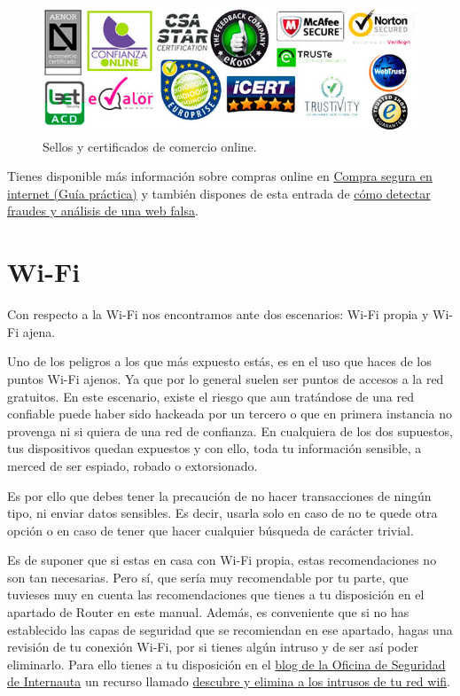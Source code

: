 \documentclass[
  spanish,
  a4paper,
  openany]{book}
\begin{document}
\begin{figure}

{\centering \includegraphics[width=0.75\linewidth]{images/sellos-de-confianza-online} 

}

\caption{Sellos y certificados de comercio online.}\label{fig:unnamed-chunk-11}
\end{figure}

Tienes disponible más información sobre compras online en \href{https://www.aepd.es/sites/default/files/2019-09/guia-compra-segura-digital-web.pdf}{Compra segura en internet (Guía práctica)} y también dispones de esta entrada de \href{https://www.osi.es/es/actualidad/blog/2018/08/08/detectando-fraudes-analisis-de-una-web-de-venta-falsa}{cómo detectar fraudes y análisis de una web falsa}.

\hypertarget{wi-fi}{%
\section{Wi-Fi}\label{wi-fi}}

Con respecto a la Wi-Fi nos encontramos ante dos escenarios: Wi-Fi propia y Wi-Fi ajena.

Uno de los peligros a los que más expuesto estás, es en el uso que haces de los puntos Wi-Fi ajenos. Ya que por lo general suelen ser puntos de accesos a la red gratuitos. En este escenario, existe el riesgo que aun tratándose de una red confiable puede haber sido hackeada por un tercero o que en primera instancia no provenga ni si quiera de una red de confianza. En cualquiera de los dos supuestos, tus dispositivos quedan expuestos y con ello, toda tu información sensible, a merced de ser espiado, robado o extorsionado.

Es por ello que debes tener la precaución de no hacer transacciones de ningún tipo, ni enviar datos sensibles. Es decir, usarla solo en caso de no te quede otra opción o en caso de tener que hacer cualquier búsqueda de carácter trivial.

Es de suponer que si estas en casa con Wi-Fi propia, estas recomendaciones no son tan necesarias. Pero sí, que sería muy recomendable por tu parte, que tuvieses muy en cuenta las recomendaciones que tienes a tu disposición en el apartado de Router en este manual. Además, es conveniente que si no has establecido las capas de seguridad que se recomiendan en ese apartado, hagas una revisión de tu conexión Wi-Fi, por si tienes algún intruso y de ser así poder eliminarlo. Para ello tienes a tu disposición en el \href{https://www.osi.es/es/actualidad/blog}{blog de la Oficina de Seguridad de Internauta} un recurso llamado \href{https://www.osi.es/es/actualidad/blog/2019/09/25/descubre-y-elimina-los-intrusos-de-tu-red-wifi}{descubre y elimina a los intrusos de tu red wifi}.
\end{document}
